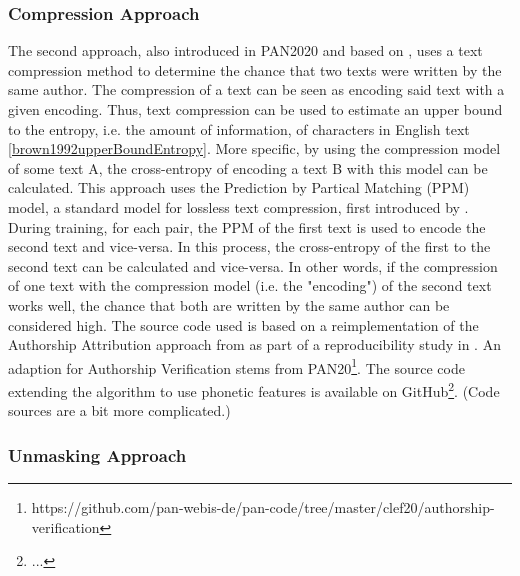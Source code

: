 
\subsubsection{Compression Approach}
The second approach, also introduced in PAN2020 and based on \cite{teahan2003compression}, uses a text compression method to determine the chance that two texts were written by the same author.
The compression of a text can be seen as encoding said text with a given encoding. Thus, text compression can be used to estimate an upper bound to the entropy, i.e. the amount of information, of characters in English text \ref{brown1992upperBoundEntropy}. More specific, by using the compression model of some text A, the cross-entropy of encoding a text B with this model can be calculated.
This approach uses the Prediction by Partical Matching (PPM) model, a standard model for lossless text compression, first introduced by \cite{cleary1984PPM}. During training, for each pair, the PPM of the first text is used to encode the second text and vice-versa. In this process, the cross-entropy of the first to the second text can be calculated and vice-versa.
In other words, if the compression of one text with the compression model (i.e. the "encoding") of the second text works well, the chance that both are written by the same author can be considered high.
The source code used is based on a reimplementation of the Authorship Attribution approach from \cite{teahan2003compression} as part of a reproducibility study in \cite{potthast2016reimplementation}. An adaption for Authorship Verification stems from PAN20\footnote{https://github.com/pan-webis-de/pan-code/tree/master/clef20/authorship-verification}. The source code extending the algorithm to use phonetic features is available on GitHub\footnote{...}. (Code sources are a bit more complicated.)
\subsubsection{Unmasking Approach}

